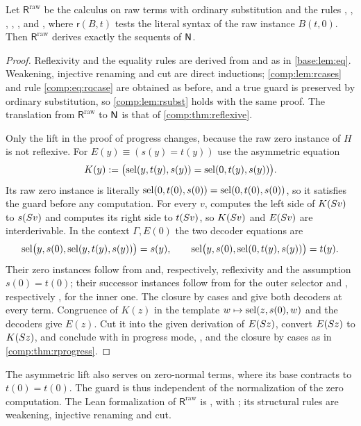 \begin{proposition}
\label{comp:prop:rawreflexive}
Let $\mathsf{R}^{\mathrm{raw}}$ be the calculus on raw terms with ordinary
substitution and the rules , , ,
, ,  and , where
$\mathsf{r}(B,t)$ tests the literal syntax of the raw instance $B(t,0)$.
Then $\mathsf{R}^{\mathrm{raw}}$ derives exactly the sequents of $\mathsf{N}$.
\end{proposition}

\begin{proof}
Reflexivity and the equality rules are derived from  and
 as in \cref{base:lem:eq}. Weakening, injective renaming and cut are direct
inductions; \cref{comp:lem:rcases} and rule \eqref{comp:eq:rqcase} are
obtained as before, and a true guard is preserved by ordinary substitution,
so \cref{comp:lem:rsubst} holds with the same proof. The translation from
$\mathsf{R}^{\mathrm{raw}}$ to $\mathsf{N}$ is that of \cref{comp:thm:reflexive}.

Only the lift in the proof of progress changes, because the raw zero
instance of $H$ is not reflexive. For $E(y)\equiv(s(y)=t(y))$ use the
asymmetric equation
\[
 K(y)\mathrel{:=}\bigl(\operatorname{sel}(y,t(y),s(y))=\operatorname{sel}(0,t(y),s(y))\bigr).
\]
Its raw zero instance is literally
$\operatorname{sel}(0,t(0),s(0))=\operatorname{sel}(0,t(0),s(0))$, so it satisfies the guard before any
computation. For every $v$,  computes the left side of
$K(S v)$ to $s(S v)$ and  computes its right side to
$t(S v)$, so $K(S v)$ and $E(S v)$ are interderivable. In the
context $\Gamma,E(0)$ the two decoder equations are
\[
 \operatorname{sel}\bigl(y,s(0),\operatorname{sel}(y,t(y),s(y))\bigr)=s(y),\qquad
 \operatorname{sel}\bigl(y,s(0),\operatorname{sel}(0,t(y),s(y))\bigr)=t(y).
\]
Their zero instances follow from  and, respectively,
reflexivity and the assumption $s(0)=t(0)$; their successor instances
follow from  for the outer selector and ,
respectively , for the inner one. The closure by cases and
 give both decoders at every term. Congruence of $K(z)$ in the
template $w\mapsto\operatorname{sel}(z,s(0),w)$ and the decoders give $E(z)$. Cut it into
the given derivation of $E(S z)$, convert $E(S z)$ to $K(S z)$, and
conclude with  in progress mode, , 
and the closure by cases as in \cref{comp:thm:rprogress}.
\end{proof}

The asymmetric lift also serves on zero-normal terms, where its base
contracts to $t(0)=t(0)$. The guard is thus independent of the
normalization of the zero computation. The Lean formalization of
$\mathsf{R}^{\mathrm{raw}}$ is , with ;
its structural rules are weakening, injective renaming and cut.


